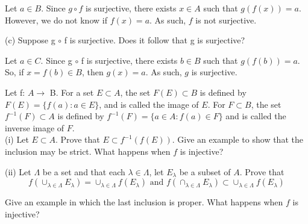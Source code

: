 \documentclass[addpoints]{exam}
\begin{document}
\begin{questions}
Let $a \in B$. Since $g \circ f$ is surjective, there exists $x \in A$ such that $g(f(x)) = a$. However, 
we do not know if $f(x) = a$. As such, $f$ is not surjective. 

(c) Suppose g $\circ$ f is surjective. Does it follow that g is surjective?

Let $a \in C$. Since g $\circ$ f is surjective, there exists $b \in B$ such that $g(f(b)) = a$. So, 
if $x = f(b) \in B$, then $g(x) = a$. As such, $g$ is surjective.

\question Let f: $A \rightarrow$ B. For a set $E \subset A$, the set $F(E) \subset B$ is defined by $F(E) = \{f(a): a \in E\}$, and 
is called the image of $E$. For $F \subset B$, the set $f^{-1}(F) \subset A$ is defined by $f^{-1}(F) = \{a \in A: f(a) \in F\}$ and is 
called the inverse image of $F$. \\
(i) Let $E \subset A$. Prove that $E \subset f^{-1}(f(E))$. Give an example to show that the inclusion may be strict. 
What happens when $f$ is injective? 

(ii) Let $\Lambda$ be a set and that each $\lambda \in \Lambda$, let $E_{\lambda}$ be a subset of $A$. Prove that 
\[f(\cup_{\lambda \in \Lambda}E_{\lambda}) = \cup_{\lambda \in \Lambda} f(E_\lambda) \text{ and } f(\cap_{\lambda \in \Lambda}E_{\lambda})
\subset \cup_{\lambda \in \Lambda}f(E_\lambda)\]

Give an example in which the last inclusion is proper. What happens when $f$ is injective?

\end{questions}
\end{document}
